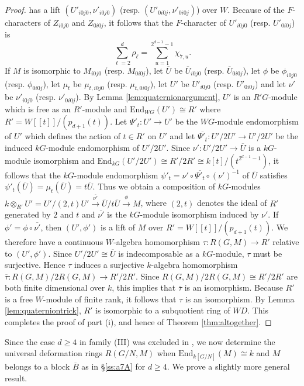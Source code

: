 \documentclass{amsart}
\theoremstyle{plain}
\theoremstyle{definition}
\theoremstyle{remark}
\begin{document}
\begin{proof}
has a lift $(U'_{i0j0},\nu'_{i0j0})$ (resp. $(U'_{0i0j},\nu'_{0i0j})$) over $W$. Because of the $F$-characters of 
$Z_{i0j0}$ and $Z_{0i0j}$, it follows that the $F$-character of  $U'_{i0j0}$ (resp. $U'_{0i0j}$)
is
$$\sum_{\ell=2}^{d}\rho_\ell=\sum_{u=1}^{2^{d-1}-1}\chi_{7,u}.$$
If $M$ is isomorphic to $M_{i0j0}$ (resp. $M_{0i0j}$), let $\overline{U}$ be $\overline{U}_{i0j0}$
(resp. $\overline{U}_{0i0j}$), let $\phi$ be $\phi_{i0j0}$ (resp. $\phi_{0i0j}$),
let $\mu_t$ be $\mu_{t,i0j0}$ (resp. $\mu_{t,0i0j}$),
let $U'$ be $U'_{i0j0}$ (resp. $U'_{0i0j}$) and let $\nu'$ be $\nu'_{i0j0}$ (resp. $\nu'_{0i0j}$). 
By Lemma \ref{lem:quaternionargument}, $U'$ is an $R'G$-module which is 
free as an $R'$-module and $\mathrm{End}_{WG}(U')\cong R'$
where $R'=W[[t]]/(p_{d+1}(t))$. Let $\Psi'_t:U'\to U'$ be the $WG$-module endomorphism of $U'$ which
defines the action of $t\in R'$ on $U'$ and let $\overline{\Psi'_t}:U'/2U'\to U'/2U'$ be the induced
$kG$-module endomorphism of $U'/2U'$. Since $\nu':U'/2U'\to \overline{U}$ is a $kG$-module isomorphism
and $\mathrm{End}_{kG}(U'/2U')\cong R'/2R'\cong k[t]/(t^{2^{d-1}-1})$, it follows that
the $kG$-module endomorphism $\psi'_t=\nu'\circ\overline{\Psi'_t}\circ (\nu')^{-1}$ of $\overline{U}$
satisfies $\psi'_t(\overline{U})=\mu_t(\overline{U}) =t\overline{U}$. 
Thus we obtain a composition of $kG$-modules 
$k\otimes_{R'}U'=U'/(2,t) U'\xrightarrow{\overline{\nu'}} \overline{U}/t\overline{U} \xrightarrow{\phi} M$,
where $(2,t)$ denotes the ideal of $R'$ generated by $2$ and $t$ and
$\overline{\nu'}$ is the $kG$-module isomorphism induced by $\nu'$. If
$\phi'=\phi\circ\overline{\nu'}$, then
$(U',\phi')$ is a lift of $M$ over $R'=W[[t]]/(p_{d+1}(t))$.
We therefore have a 
continuous $W$-algebra homomorphism $\tau:R(G,M)\to R'$ relative to $(U',\phi')$. Since $U'/2U'\cong
\overline{U}$ is indecomposable as a $kG$-module, $\tau$ must be surjective. 
Hence $\tau$ induces a surjective $k$-algebra homomorphism $\overline{\tau}:
R(G,M)/2R(G,M)\to R'/2R'$. Since $R(G,M)/2R(G,M)\cong R'/2R'$ are both finite dimensional over $k$, 
this implies that $\overline{\tau}$ is an isomorphism. Because $R'$ is a free $W$-module of finite rank, 
it follows that $\tau$ is an isomorphism.
By Lemma \ref{lem:quaterniontrick}, $R'$ is isomorphic to a subquotient ring of $WD$.
This completes the proof of part (i), and hence of Theorem \ref{thm:altogether}.
\end{proof}

Since the case $d\ge 4$ in family (III) was excluded in \cite{3sim}, we now determine the universal
deformation rings $R(G/N,M)$ when $\mathrm{End}_{k[G/N]}(M)\cong k$ and $M$ belongs to a block
$\overline{B}$ as in \S\ref{ss:a7A} for $d\ge 4$. We prove a slightly more general result.
\end{document}
